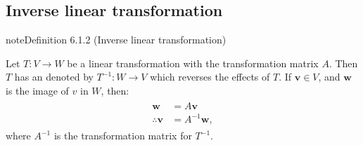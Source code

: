 \documentclass[letterpaper,10pt,english]{jupyterBook}
\begin{document}
\subsection{Inverse linear transformation}
\label{\detokenize{_pages/6.1_Transformation_matrices:inverse-linear-transformation}}\label{\detokenize{_pages/6.1_Transformation_matrices:index-0}}\label{_pages/6.1_Transformation_matrices:inverse-transformation-definition}
\begin{sphinxadmonition}{note}{Definition 6.1.2 (Inverse linear transformation)}



\sphinxAtStartPar
Let \(T: V \to W\) be a linear transformation with the transformation matrix \(A\). Then \(T\) has an  denoted by \(T^{-1}: W \to V\) which reverses the effects of \(T\). If \(\mathbf{v} \in V\), and \(\mathbf{w}\) is the image of \(v\) in \(W\), then:
\begin{equation*}
\begin{split} \begin{align*}
    \mathbf{w} &= A \mathbf{v} \\
    \therefore \mathbf{v} & = A^{-1}\mathbf{w},
\end{align*} \end{split}
\end{equation*}
\sphinxAtStartPar
where \(A^{-1}\) is the transformation matrix for \(T^{-1}\).
\end{sphinxadmonition}
\label{_pages/6.1_Transformation_matrices:inverse-transformation-example}
\end{document}
